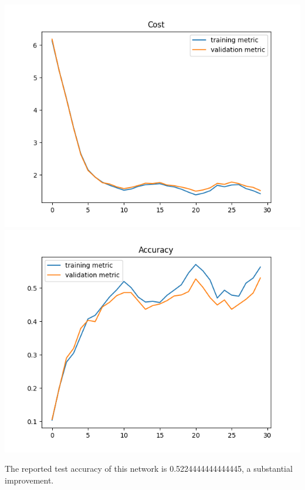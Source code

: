 \documentclass[11pt,a4paper]{article}
\begin{document}
\includegraphics[width=\textwidth]{optimal_cost_k=9.png}
\includegraphics[width=\textwidth]{optimal_accuracy_k=9.png}

The reported test accuracy of this network is 0.5224444444444445, a substantial improvement.
\end{document}
